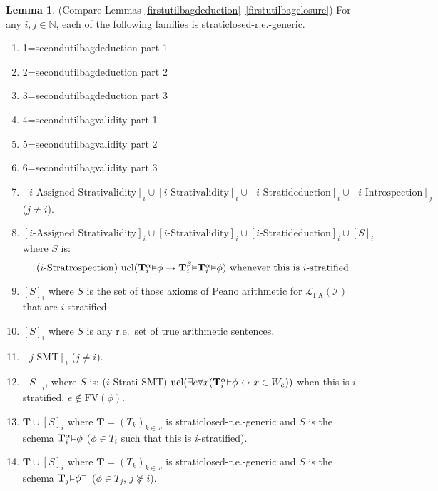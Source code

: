 \documentclass[reqno]{article}
\theoremstyle{definition}
\newtheorem{lemma}[theorem]{Lemma}
\def\N{\mathbb{N}}
\def\L{\mathscr{L}}
\def\T{\mathbf{T}}
\def\FV{\mathrm{FV}}
\def\LPA{\L_{\mathrm{PA}}}
\def\indset{\mathcal I}
\renewcommand{\Pr}[1]{\T_{#1}\mbox{\small${\vDash}$}}
\newcommand{\Prr}[2]{\T^{#1}_{#2}\mbox{\small${\vDash}$}}
\newcommand{\ucl}[1]{\mathrm{ucl}(#1)}
\begin{document}
\begin{lemma}
\label{secondgrabbag}
(Compare Lemmas \ref{firstutilbagdeduction}--\ref{firstutilbagclosure})
For any $i,j\in\N$, each of the following families
is straticlosed-r.e.-generic.
\begin{enumerate}
\item 1=secondutilbagdeduction part 1
\item 2=secondutilbagdeduction part 2
\item 3=secondutilbagdeduction part 3
\item 4=secondutilbagvalidity part 1
\item 5=secondutilbagvalidity part 2
\item 6=secondutilbagvalidity part 3
\item $[\mbox{$i$-Assigned Strativalidity}]_i \cup [\mbox{$i$-Strativalidity}]_i \cup [\mbox{$i$-Stratideduction}]_i
\cup [\mbox{$i$-Introspection}]_j$ ($j\not=i$).
\item $[\mbox{$i$-Assigned Strativalidity}]_i \cup [\mbox{$i$-Strativalidity}]_i \cup [\mbox{$i$-Stratideduction}]_i
\cup [S]_i$ where $S$ is:
\[\mbox{($i$-Stratrospection) $\ucl{\Prr\alpha i\phi\rightarrow \Prr\beta
i\Prr\alpha i\phi}$
whenever this is $i$-stratified.}\]
\item $[S]_i$ where $S$ is the set of those axioms of Peano arithmetic for
$\LPA(\indset)$ that are $i$-stratified.
\item $[S]_i$ where $S$ is any r.e.~set of true arithmetic sentences.
\item $[\mbox{$j$-SMT}]_i$ ($j\not=i$).
\item $[S]_i$, where $S$ is: ($i$-Strati-SMT)
$\ucl{\exists e\forall x(\Prr\alpha i\phi\leftrightarrow x\in W_e)}$
when this is $i$-stratified, $e\not\in\FV(\phi)$.
\item $\T\cup [S]_i$ where $\T=(T_k)_{k\in\omega}$ is straticlosed-r.e.-generic
and $S$ is the schema $\Prr\alpha i\phi$ ($\phi\in T_i$ such that this is $i$-stratified).
\item $\T\cup [S]_i$ where $\T=(T_k)_{k\in\omega}$ is straticlosed-r.e.-generic
and $S$ is the schema $\Pr j\phi^-$ ($\phi\in T_j$, $j\not \succeq i$).
\end{enumerate}
\end{lemma}
\end{document}

